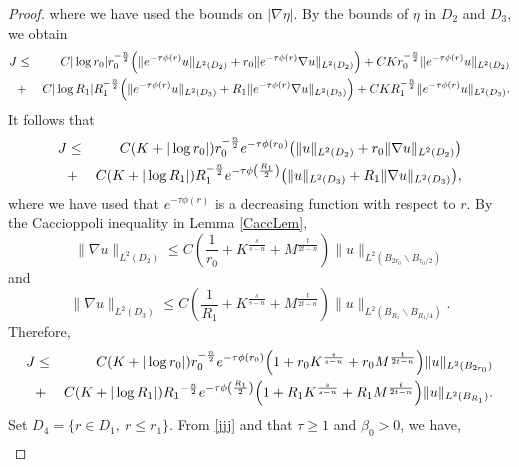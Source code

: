 \documentclass[11pt]{amsart}
\theoremstyle{plain}
\numberwithin{equation}{section}
\begin{document}
\begin{proof}
where we have used the bounds on ${\left\vert{{\nabla} \eta}\right\vert}$.
By the bounds of $\eta$ in $D_2$ and $D_3$, we obtain
\begin{eqnarray*}
J &\leq & C |\log r_0| r_0^{-\frac{n}{2}}{\left( {\|e^{-\tau \phi(r)}
u\|_{{L^2(D_2)}}+ r_0 \|e^{-\tau \phi(r)} \nabla
u\|_{{L^2(D_2)}}} \right) }
+CK r_0^{-\frac{n}{2}}\|e^{-\tau \phi(r)}u\|_{{L^2(D_2)}} \nonumber \medskip \\
&+& C|\log R_1|R_1^{-\frac{n}{2}}{\left( {\|e^{-\tau \phi(r)} u\|_{{L^2(D_3)}}+ R_1
\|e^{-\tau \phi(r)} \nabla u\|_{{L^2(D_3)}}} \right) }
+CK R_1^{-\frac{n}{2}}\|e^{-\tau \phi(r)} u\|_{{L^2(D_3)}}.
\end{eqnarray*}
It follows that
\begin{eqnarray*}
J &\leq & C{\left( {K + |\log r_0|} \right) } r_0^{-\frac{n}{2}} e^{-\tau \phi(r_0)}  {\left( {\| u\|_{{L^2(D_2)}}+ r_0
\|\nabla u\|_{{L^2(D_2)}}} \right) } \nonumber \medskip \\
&+& C{\left( {K+ |\log R_1|} \right) } R_1^{-\frac{n}{2}}e^{-\tau \phi{\left( {\frac{R_1}{2}} \right) }} {\left( {\|
u\|_{{L^2(D_3)}}+ R_1 \| \nabla u\|_{{L^2(D_3)}}} \right) },
\end{eqnarray*}
where we have used that $e^{-\tau\phi(r)}$ is a decreasing function with respect to $r$.
By the Caccioppoli inequality in Lemma \ref{CaccLem},
\begin{equation*}
\|\nabla u\|_{L^2(D_2)}\leq
C{\left( {\frac{1}{r_0}+K^{\frac{s}{s-n}}+M^{\frac{t}{2t-n}}} \right) }\|
u\|_{L^2{\left( {B_{2r_0}\backslash B_{{r_0}/{2}}} \right) }}
\end{equation*}
and
\begin{equation*}
\|\nabla u\|_{L^2(D_3)}\leq
C{\left( {\frac{1}{R_1}+K^{\frac{s}{s-n}}+M^{\frac{t}{2t-n}}} \right) }\|
u\|_{L^2{\left( {B_{R_1}\backslash B_{{R_1}/{4}}} \right) }}.
\end{equation*}
Therefore,
\begin{eqnarray*}
J
&\leq& C{\left( {K+|\log r_0|} \right) } r_0^{-\frac{n}{2}}e^{-\tau
\phi(r_0)}{\left( {1+ r_0K^{\frac{s}{s-n}}+r_0M^{\frac{t}{2t-n}}} \right) }\|u\|_{L^2(B_{2r_0})}  \nonumber \medskip \\
&+& C{\left( {K+|\log R_1|} \right) } {R_1}^{-\frac{n}{2}}e^{-\tau
\phi{\left( {\frac{R_1}{2}} \right) }}{\left( {1+R_1K^{\frac{s}{s-n}}+R_1M^{\frac{t}{2t-n}}} \right) }
\|u\|_{L^2(B_{R_1})}.
\end{eqnarray*}
Set $D_4=\{r\in D_1, \ r\leq r_1\}$.
From \eqref{jjj} and that $\tau \ge 1$ and ${\beta}_0 > 0$, we have,
\begin{align*}

\end{align*}
\end{proof}
\end{document}
